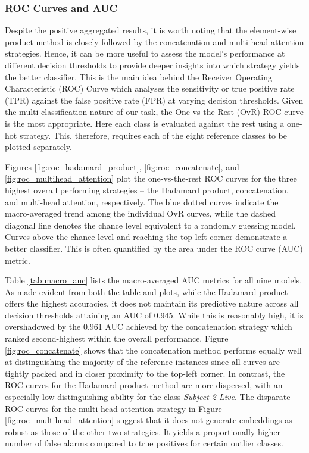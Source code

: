 \documentclass{mpaper}
\begin{document}
\subsubsection{ROC Curves and AUC}
Despite the positive aggregated results, it is worth noting that the element-wise product method is closely followed by the concatenation and multi-head attention strategies. Hence, it can be more useful to assess the model's performance at different decision thresholds to provide deeper insights into which strategy yields the better classifier. This is the main idea behind the Receiver Operating Characteristic (ROC) Curve which analyses the sensitivity or true positive rate (TPR) against the false positive rate (FPR) at varying decision thresholds. Given the multi-classification nature of our task, the One-vs-the-Rest (OvR) ROC curve is the most appropriate. Here each class is evaluated against the rest using a one-hot strategy. This, therefore, requires each of the eight reference classes to be plotted separately.

Figures \ref{fig:roc_hadamard_product}, \ref{fig:roc_concatenate}, and \ref{fig:roc_multihead_attention} plot the one-vs-the-rest ROC curves for the three highest overall performing strategies -- the \linebreak Hadamard product, concatenation, and multi-head attention, respectively. The blue dotted curves indicate the macro-averaged trend among the individual OvR curves, while the dashed diagonal line denotes the chance level equivalent to a randomly guessing model. Curves above the chance level and reaching the top-left corner demonstrate a better classifier. This is often quantified by the area under the ROC curve (AUC) metric.

Table \ref{tab:macro_auc} lists the macro-averaged AUC metrics for all nine models. As made evident from both the table and plots, while the Hadamard product offers the highest accuracies, it does not maintain its predictive nature across all decision thresholds attaining an AUC of 0.945. While this is reasonably high, it is overshadowed by the 0.961 AUC achieved by the concatenation strategy which ranked second-highest within the overall performance. Figure \ref{fig:roc_concatenate} shows that the concatenation method performs equally well at distinguishing the majority of the reference instances since all curves are tightly packed and in closer proximity to the top-left corner. In contrast, the ROC curves for the Hadamard product method are more dispersed, with an especially low distinguishing ability for the class \textit{Subject 2-Live}. The disparate ROC curves for the multi-head attention strategy in Figure \ref{fig:roc_multihead_attention} suggest that it does not generate embeddings as robust as those of the other two strategies. It yields a proportionally higher number of false alarms compared to true positives for certain outlier classes.
\end{document}
